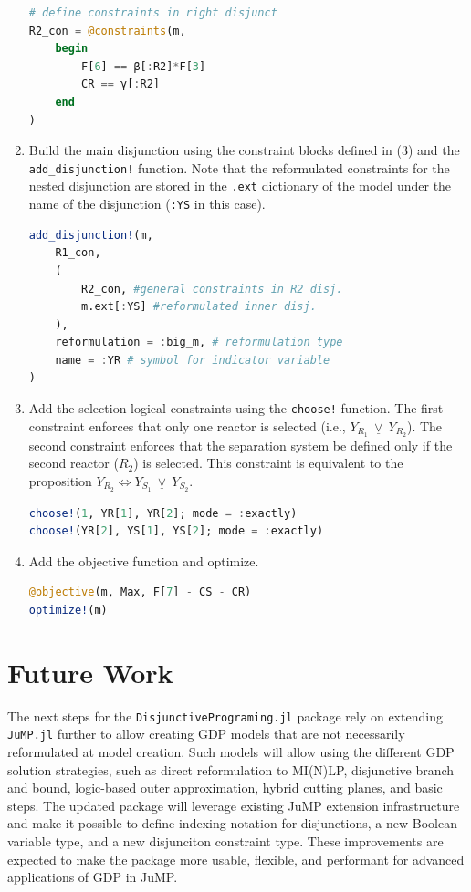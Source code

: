 \documentclass{juliacon}
\begin{document}
\begin{enumerate}
\begin{lstlisting}[language = Julia]
# define constraints in right disjunct
R2_con = @constraints(m,
    begin
        F[6] == β[:R2]*F[3]
        CR == γ[:R2]      
    end
)
\end{lstlisting}
    \item Build the main disjunction using the constraint blocks defined in (3) and the \verb|add_disjunction!| function. Note that the reformulated constraints for the nested disjunction are stored in the \verb|.ext| dictionary of the model under the name of the disjunction (\verb|:YS| in this case).
\begin{lstlisting}[language = Julia]
add_disjunction!(m,
    R1_con,
    (
        R2_con, #general constraints in R2 disj.
        m.ext[:YS] #reformulated inner disj.
    ),
    reformulation = :big_m, # reformulation type
    name = :YR # symbol for indicator variable
)
\end{lstlisting}
    \item Add the selection logical constraints using the \verb|choose!| function. The first constraint enforces that only one reactor is selected (i.e., $Y_{R_1} \ \underline{\vee} \ Y_{R_2}$). The second constraint enforces that the separation system be defined only if the second reactor ($R_2$) is selected. This constraint is equivalent to the proposition $Y_{R_2} \Leftrightarrow Y_{S_1} \ \underline{\vee} \ Y_{S_2}$.
\begin{lstlisting}[language = Julia]
choose!(1, YR[1], YR[2]; mode = :exactly)
choose!(YR[2], YS[1], YS[2]; mode = :exactly)
\end{lstlisting}
    \item Add the objective function and optimize. 
\begin{lstlisting}[language = Julia]
@objective(m, Max, F[7] - CS - CR)
optimize!(m)
\end{lstlisting}
\end{enumerate}

\section{Future Work}
The next steps for the \verb|DisjunctivePrograming.jl| package rely on extending \verb|JuMP.jl| further to allow creating GDP models that are not necessarily reformulated at model creation. Such models will allow using the different GDP solution strategies, such as direct reformulation to MI(N)LP, disjunctive branch and bound, logic-based outer approximation, hybrid cutting planes, and basic steps. The updated package will leverage existing JuMP extension infrastructure and make it possible to define indexing notation for disjunctions, a new Boolean variable type, and a new disjunciton constraint type. These improvements are expected to make the package more usable, flexible, and performant for advanced applications of GDP in JuMP.
\end{document}
